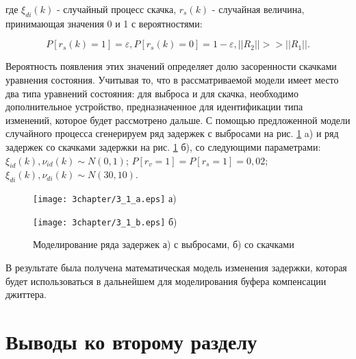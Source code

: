 \noindent где $\xi_{di}(k)$ - случайный процесс скачка, $r_s(k)$ - случайная величина, принимающая значения 0 и 1 с вероятностями:

\begin{equation}\label{eq3:spp}
P[r_s(k)=1]=\varepsilon, P[r_s(k)=0]=1-\varepsilon, ||R_2||>>||R_1||.
\end{equation}

Вероятность появления этих значений определяет долю засоренности скачками уравнения состояния. 
Учитывая то, что в рассматриваемой модели имеет место два типа уравнений состояния: для выброса и для скачка, необходимо дополнительное устройство, предназначенное для идентификации типа изменений, которое будет рассмотрено дальше.
С помощью предложенной модели случайного процесса сгенерируем ряд задержек с выбросами на рис. \ref{img3:modelJitter} a) и ряд задержек со скачками задержки на рис. \ref{img3:modelJitter} б),
со следующими параметрами: $\xi_{id}(k),\nu_{id}(k)\sim N(0,1)$; $P[r_v=1]=P[r_s=1]=0,02$; $\xi_{di}(k),\nu_{di}(k)\sim N(30,10)$.

\begin{figure} [h]
\begin{minipage}[h]{0.47\linewidth}
\center
\texttt{[image: 3chapter/3\_1\_a.eps]} а) \\
\end{minipage}
\hfill
\begin{minipage}[h]{0.47\linewidth}
\center
\texttt{[image: 3chapter/3\_1\_b.eps]} б) \\
\end{minipage}
\caption{Моделирование ряда задержек а) с выбросами, б) со скачками}
\label{img3:modelJitter}
\end{figure}

В результате была получена математическая модель изменения задержки, которая будет использоваться в дальнейшем для моделирования буфера компенсации джиттера.





\section{Выводы ко второму разделу} \label{sect:concl2}


